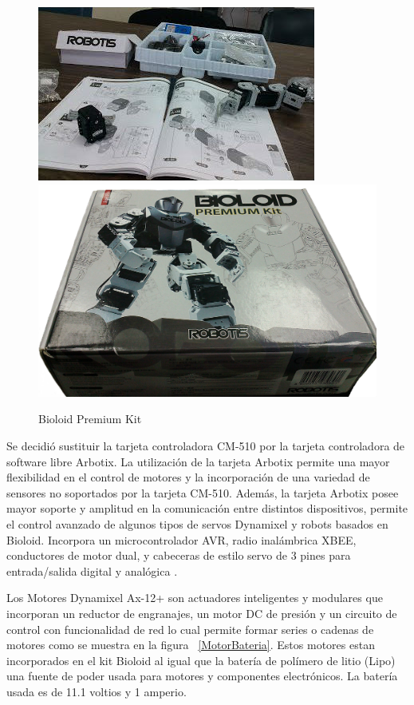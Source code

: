 \begin{figure}[hbtp]
\centering
\includegraphics[scale=0.5]{imagenes/kitAfuera.jpg}
\includegraphics[scale=0.07]{imagenes/cajaKit.jpg}
\caption{Bioloid Premium Kit}
\label{fig:kit}
\end{figure}

Se decidi\'o sustituir la tarjeta controladora CM-510 por la tarjeta controladora de software libre Arbotix. La utilización de la tarjeta Arbotix permite una mayor flexibilidad en el control de motores y la incorporación de una variedad de sensores no soportados por la tarjeta CM-510.
Además, la tarjeta Arbotix posee mayor soporte y amplitud en la comunicación entre distintos dispositivos, permite el control avanzado de algunos tipos de servos Dynamixel y robots basados en Bioloid. Incorpora un microcontrolador \gls{AVR}, radio inalámbrica \gls{XBEE}, conductores de motor dual, y cabeceras de estilo servo de 3 pines para entrada/salida digital y analógica \cite{arbotix}.

Los Motores Dynamixel Ax-12+ son actuadores inteligentes y modulares que incorporan un reductor de engranajes, un motor DC de presión y un circuito de control con funcionalidad de red lo cual permite formar series o cadenas de motores como se muestra en la figura ~\ref{MotorBateria}. Estos motores estan incorporados en el kit Bioloid al igual que la batería de polímero de litio (Lipo) una fuente de poder usada para motores y componentes electr\'onicos. La batería usada es de 11.1 voltios y 1 amperio. \cite{bateria}


